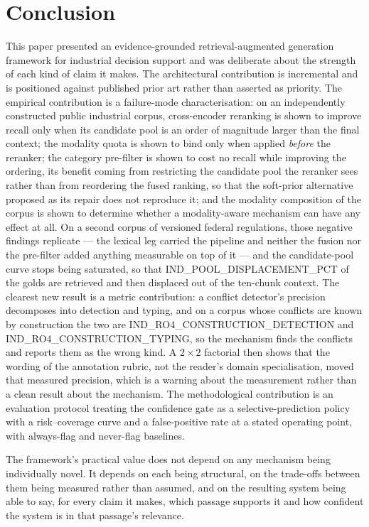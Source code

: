 \documentclass[preprint,3p,times]{elsarticle}
\begin{document}
\section{Conclusion}

This paper presented an evidence-grounded retrieval-augmented generation
framework for industrial decision support and was deliberate about the strength
of each kind of claim it makes. The architectural contribution is incremental
and is positioned against published prior art rather than asserted as priority.
The empirical contribution is a failure-mode characterisation: on an
independently constructed public industrial corpus, cross-encoder reranking is
shown to improve recall only when its candidate pool is an order of magnitude
larger than the final context; the modality quota is shown to bind only when
applied \emph{before} the reranker; the category pre-filter is shown to cost no
recall while improving the ordering, its benefit coming from restricting the
candidate pool the reranker sees rather than from reordering the fused ranking,
so that the soft-prior alternative proposed as its repair does not reproduce it;
and the modality composition of the corpus is
shown to determine whether a modality-aware mechanism can have any effect at
all. On a second corpus of versioned federal regulations, those negative
findings replicate --- the lexical leg carried the pipeline and neither the
fusion nor the pre-filter added anything measurable on top of it --- and the
candidate-pool curve stops being saturated, so that
{{IND_POOL_DISPLACEMENT_PCT}} of the golds are retrieved and then displaced
out of the ten-chunk context. The clearest new result is a metric
contribution: a conflict detector's precision decomposes into detection and
typing, and on a corpus whose conflicts are known by construction the two are
{{IND_RO4_CONSTRUCTION_DETECTION}} and {{IND_RO4_CONSTRUCTION_TYPING}}, so the
mechanism finds the conflicts and reports them as the wrong kind. A $2\times
2$ factorial then shows that the wording of the annotation rubric, not the
reader's domain specialisation, moved that measured precision, which is a
warning about the measurement rather than a clean result about the mechanism.
The methodological contribution is an evaluation protocol treating the
confidence gate as a selective-prediction policy with a risk--coverage curve
and a false-positive rate at a stated operating point, with always-flag and
never-flag baselines.

The framework's practical value does not depend on any mechanism being
individually novel. It depends on each being structural, on the trade-offs
between them being measured rather than assumed, and on the resulting system
being able to say, for every claim it makes, which passage supports it and how
confident the system is in that passage's relevance.
\end{document}
